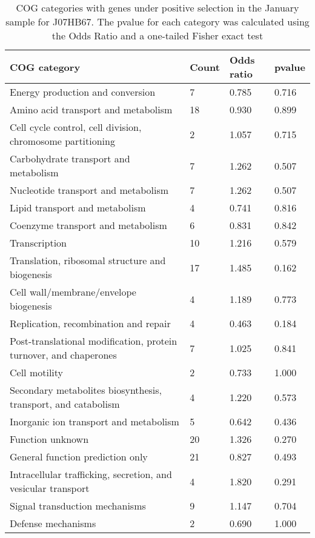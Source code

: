 \begin{table}[]
\footnotesize 
	\tabcolsep=0.11cm 
\caption{COG categories with genes under positive selection in the January sample for J07HB67. The pvalue for each category was calculated using the Odds Ratio and a one-tailed Fisher exact test} 
\begin{tabularx}{\textwidth}{L{6cm}R{2cm}R{2cm}R{2cm}} 
\hline 
\textbf{COG category} & \textbf{Count} & \textbf{Odds ratio} & \textbf{pvalue} \\ 
\hline 
Energy production and conversion & 7 & 0.785 & 0.716 \\ 
Amino acid transport and metabolism & 18 & 0.930 & 0.899 \\ 
Cell cycle control, cell division, chromosome partitioning & 2 & 1.057 & 0.715 \\ 
Carbohydrate transport and metabolism & 7 & 1.262 & 0.507 \\ 
Nucleotide transport and metabolism & 7 & 1.262 & 0.507 \\ 
Lipid transport and metabolism & 4 & 0.741 & 0.816 \\ 
Coenzyme transport and metabolism & 6 & 0.831 & 0.842 \\ 
Transcription & 10 & 1.216 & 0.579 \\ 
Translation, ribosomal structure and biogenesis & 17 & 1.485 & 0.162 \\ 
Cell wall/membrane/envelope biogenesis & 4 & 1.189 & 0.773 \\ 
Replication, recombination and repair & 4 & 0.463 & 0.184 \\ 
Post-translational modification, protein turnover, and chaperones & 7 & 1.025 & 0.841 \\ 
Cell motility & 2 & 0.733 & 1.000 \\ 
Secondary metabolites biosynthesis, transport, and catabolism & 4 & 1.220 & 0.573 \\ 
Inorganic ion transport and metabolism & 5 & 0.642 & 0.436 \\ 
Function unknown & 20 & 1.326 & 0.270 \\ 
General function prediction only & 21 & 0.827 & 0.493 \\ 
Intracellular trafficking, secretion, and vesicular transport & 4 & 1.820 & 0.291 \\ 
Signal transduction mechanisms & 9 & 1.147 & 0.704 \\ 
Defense mechanisms & 2 & 0.690 & 1.000 \\ 
\end{tabularx} 
\label{January_COG_Selection_J07HB67} 
 \end{table} 

